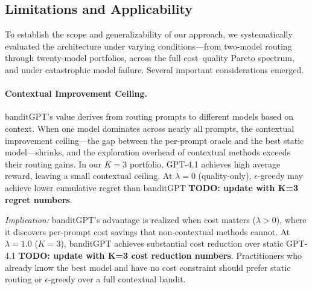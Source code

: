 
\subsection{Limitations and Applicability}
\label{sec:limitations}

To establish the scope and generalizability of our approach, we systematically
evaluated the architecture under varying conditions---from two-model routing
through twenty-model portfolios, across the full cost--quality Pareto spectrum,
and under catastrophic model failure.
Several important considerations emerged.

\paragraph{Contextual Improvement Ceiling.}
banditGPT's value derives from routing prompts to different models based on
context.
When one model dominates across nearly all prompts, the contextual improvement
ceiling---the gap between the per-prompt oracle and the best static
model---shrinks, and the exploration overhead of contextual methods exceeds
their routing gains.
In our $K{=}3$ portfolio, GPT-4.1 achieves high average
reward, leaving a small contextual ceiling.
At $\lambda{=}0$ (quality-only), $\epsilon$-greedy may achieve
lower cumulative regret than banditGPT \textbf{TODO: update with K=3 regret numbers}.

\emph{Implication:}
banditGPT's advantage is realized when cost matters ($\lambda > 0$), where it
discovers per-prompt cost savings that non-contextual methods cannot.
At $\lambda{=}1.0$ ($K{=}3$), banditGPT achieves substantial cost reduction over
static GPT-4.1 \textbf{TODO: update with K=3 cost reduction numbers}.
Practitioners who already know the best model and have no cost constraint
should prefer static routing or $\epsilon$-greedy over a full contextual
bandit.

